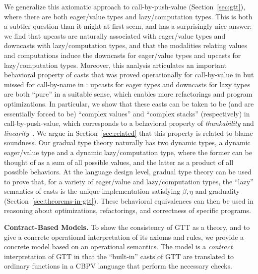 \documentclass[acmsmall,screen,12pt]{acmart}
\begin{document}
We generalize this axiomatic approach to call-by-push-value
(Section~\ref{sec:gtt}), where there are both eager/value types and
lazy/computation types. This is both a subtler question than it might at
first seem, and has a surprisingly nice answer: we find that upcasts are
naturally associated with eager/value types and downcasts with
lazy/computation types, and that the modalities relating values and
computations induce the downcasts for eager/value types and upcasts for
lazy/computation types.  Moreover, this analysis articulates an
important behavioral property of casts that was proved operationally for
call-by-value in \citep{newahmed18} but missed for call-by-name in
\citep{newlicata2018-fscd}: upcasts for eager types and downcasts for
lazy types are both ``pure'' in a suitable sense, which enables more
refactorings and program optimizations.  In particular, we show that
these casts can be taken to be (and are essentially forced to be)
``complex values'' and ``complex stacks'' (respectively) in
call-by-push-value, which corresponds to a behavioral property of
\emph{thunkability} and
\emph{linearity}~\cite{munchmaccagnoni14nonassociative}.  We argue in
Section~\ref{sec:related} that this property is related to blame
soundness.  Our gradual type theory naturally has two dynamic types, a
dynamic eager/value type and a dynamic lazy/computation type, where the
former can be thought of as a sum of all possible values, and the latter
as a product of all possible behaviors.  At the language design level,
gradual type theory can be used to prove that, for a variety of
eager/value and lazy/computation types, the ``lazy'' semantics of casts
is the unique implementation satisfying $\beta,\eta$ and graduality
(Section~\ref{sec:theorems-in-gtt}). These behavioral equivalences can
then be used in reasoning about optimizations, refactorings, and
correctness of specific programs.

\textbf{Contract-Based Models.}
To show the consistency of GTT as a theory, and to give a concrete
operational interpretation of its axioms and rules, we provide a
concrete model based on an operational semantics.
%
The model is a \emph{contract} interpretation of GTT in that the
``built-in'' casts of GTT are translated to ordinary functions in a
CBPV language that perform the necessary checks.  
%
\end{document}
